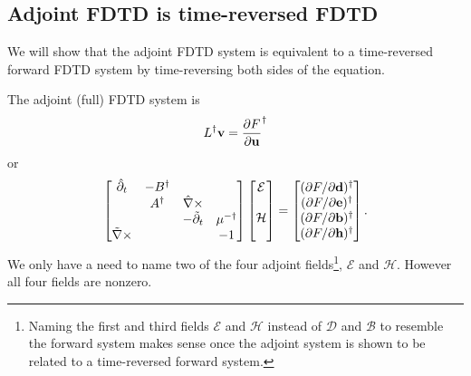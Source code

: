 \subsection{Adjoint FDTD is time-reversed FDTD}

We will show that the adjoint FDTD system is equivalent to a time-reversed forward FDTD system by time-reversing both sides of the equation.

The adjoint (full) FDTD system is
%
\begin{equation}
L^\dagger \textbf{v} = \frac{\partial{F}}{\partial{\textbf{u}}}^\dagger
\end{equation}
%
or
%
\begin{equation}
\begin{bmatrix}
\hat{\partial}_t & -B^\dagger & & \\
& A^\dagger & \hat{\nabla} \times & \\
& & -\tilde{\partial}_t & \mu^{-\dagger} \\
\tilde{\nabla} \times & & & -1
\end{bmatrix}
\begin{bmatrix}
\mathcal{E}  \\ \\ \mathcal{H} \\ \\
\end{bmatrix}
=
\begin{bmatrix}
(\partial{F}/\partial{\textbf{d}})^\dagger \\
(\partial{F}/\partial{\textbf{e}})^\dagger \\
(\partial{F}/\partial{\textbf{b}})^\dagger \\
(\partial{F}/\partial{\textbf{h}})^\dagger
\end{bmatrix}.
\end{equation}
%
We only have a need to name two of the four adjoint fields\footnote{Naming the first and third fields $\mathcal{E}$ and $\mathcal{H}$ instead of $\mathcal{D}$ and $\mathcal{B}$ to resemble the forward system makes sense once the adjoint system is shown to be related to a time-reversed forward system.}, $\mathcal{E}$ and $\mathcal{H}$.  However all four fields are nonzero.

